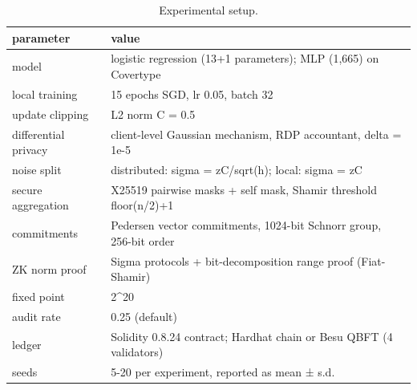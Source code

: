 \begin{table}
\caption{Experimental setup.}
\label{tab:T19_experimental_setup}
\begin{tabular}{ll}
\toprule
parameter & value \\
\midrule
model & logistic regression (13+1 parameters); MLP (1,665) on Covertype \\
local training & 15 epochs SGD, lr 0.05, batch 32 \\
update clipping & L2 norm C = 0.5 \\
differential privacy & client-level Gaussian mechanism, RDP accountant, delta = 1e-5 \\
noise split & distributed: sigma = zC/sqrt(h); local: sigma = zC \\
secure aggregation & X25519 pairwise masks + self mask, Shamir threshold floor(n/2)+1 \\
commitments & Pedersen vector commitments, 1024-bit Schnorr group, 256-bit order \\
ZK norm proof & Sigma protocols + bit-decomposition range proof (Fiat-Shamir) \\
fixed point & 2\textasciicircum 20 \\
audit rate & 0.25 (default) \\
ledger & Solidity 0.8.24 contract; Hardhat chain or Besu QBFT (4 validators) \\
seeds & 5-20 per experiment, reported as mean ± s.d. \\
\bottomrule
\end{tabular}
\end{table}
